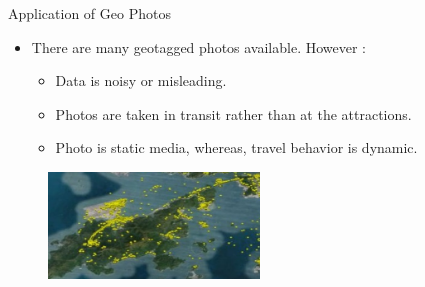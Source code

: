 \documentclass[
 size=14pt,
 paper=smartboard,  %
 mode=present, 		%
 display=slides, 	%
 style=tuliplab,  	%
 pauseslide,
 fleqn,leqno]{powerdot}
\begin{document}
\begin{slide}[toc=,bm=]{Application of Geo Photos}

\begin{itemize}
\item
There are many geotagged photos available. However :

\begin{itemize}
\item
Data is noisy or misleading.

\item
Photos are taken in transit rather than at the attractions.

\item
Photo is static media, whereas, travel behavior is dynamic.
\end{itemize}

\end{itemize}
\begin{figure}[htbp]
    \centering
    \includegraphics[width=0.5\textwidth]{figures//theme1//Theme1_11.eps}
\end{figure}
\end{slide}
\end{document}
